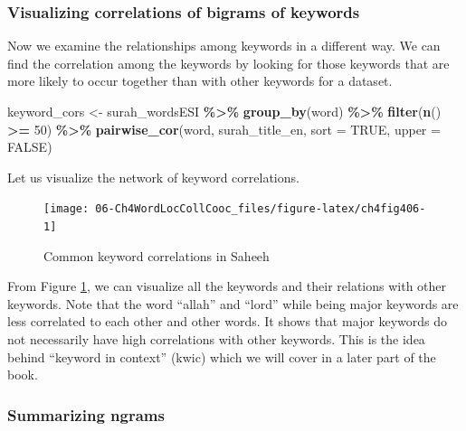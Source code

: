 \documentclass[
]{article}
\newenvironment{Shaded}{\begin{snugshade}}{\end{snugshade}}
\newcommand{\AttributeTok}[1]{\textcolor[rgb]{0.13,0.29,0.53}{#1}}
\newcommand{\ConstantTok}[1]{\textcolor[rgb]{0.56,0.35,0.01}{#1}}
\newcommand{\DecValTok}[1]{\textcolor[rgb]{0.00,0.00,0.81}{#1}}
\newcommand{\FunctionTok}[1]{\textcolor[rgb]{0.13,0.29,0.53}{\textbf{#1}}}
\newcommand{\NormalTok}[1]{#1}
\newcommand{\OtherTok}[1]{\textcolor[rgb]{0.56,0.35,0.01}{#1}}
\newcommand{\SpecialCharTok}[1]{\textcolor[rgb]{0.81,0.36,0.00}{\textbf{#1}}}
\begin{document}
\hypertarget{visualizing-correlations-of-bigrams-of-keywords}{%
\subsubsection{Visualizing correlations of bigrams of keywords}\label{visualizing-correlations-of-bigrams-of-keywords}}

Now we examine the relationships among keywords in a different way. We can find the correlation among the keywords by looking for those keywords that are more likely to occur together than with other keywords for a dataset.

\footnotesize

\begin{Shaded}
\begin{Highlighting}[]
\NormalTok{keyword\_cors }\OtherTok{\textless{}{-}}\NormalTok{ surah\_wordsESI }\SpecialCharTok{\%\textgreater{}\%} 
  \FunctionTok{group\_by}\NormalTok{(word) }\SpecialCharTok{\%\textgreater{}\%}
  \FunctionTok{filter}\NormalTok{(}\FunctionTok{n}\NormalTok{() }\SpecialCharTok{\textgreater{}=} \DecValTok{50}\NormalTok{) }\SpecialCharTok{\%\textgreater{}\%}
  \FunctionTok{pairwise\_cor}\NormalTok{(word, surah\_title\_en, }\AttributeTok{sort =} \ConstantTok{TRUE}\NormalTok{, }\AttributeTok{upper =} \ConstantTok{FALSE}\NormalTok{)}
\end{Highlighting}
\end{Shaded}

\normalsize

Let us visualize the network of keyword correlations.

\begin{figure}

{\centering \texttt{[image: 06-Ch4WordLocCollCooc\_files/figure-latex/ch4fig406-1]} 

}

\caption{Common keyword correlations in Saheeh}\label{fig:ch4fig406}
\end{figure}

From Figure \ref{fig:ch4fig406}, we can visualize all the keywords and their relations with other keywords. Note that the word ``allah'' and ``lord'' while being major keywords are less correlated to each other and other words. It shows that major keywords do not necessarily have high correlations with other keywords. This is the idea behind ``keyword in context'' (kwic) which we will cover in a later part of the book.

\hypertarget{summarizing-ngrams}{%
\subsubsection{Summarizing ngrams}\label{summarizing-ngrams}}
\end{document}
